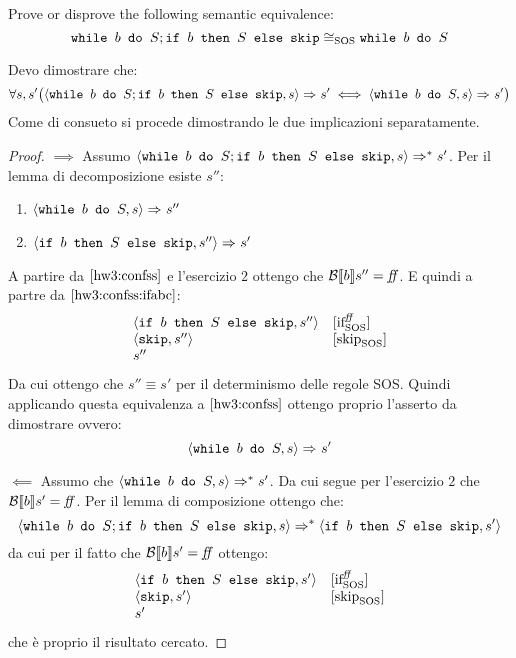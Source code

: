 {
  Prove or disprove the following semantic equivalence:
  $$
  \wbS{b}{S}; \ifABC{b}{S}{\skipForFriends} \eqSOS \wbS{b}{S}
  $$
}
{
  Devo dimostrare che:
  $$
  \forall s, s' \big( \confSs{\wbS{b}{S}; \ifABC{b}{S}{\skipForFriends}}{s}
  \Rar{} s' \iff \confSs{\wbS{b}{S}}{s} \Rar{} s'\big)
  $$
  Come di consueto si procede dimostrando le due implicazioni separatamente.
  \begin{proof}
    $\boxed{\implies}$
    Assumo $\confSs{\wbS{b}{S}; \ifABC{b}{S}{\skipForFriends}}{s} \Rar{*}
    s'$.
    Per il lemma di decomposizione esiste $s''$:
    \begin{enumerate}
    \item $\confSs{\wbS{b}{S}}{s} \Rar{ } s''$
      \label{hw3:confss}
    \item $\confSs{\ifABC{b}{S}{\skipForFriends}}{s''} \Rar{ } s'$
      \label{hw3:confss:ifabc}
    \end{enumerate}
    A partire da $\ref{hw3:confss}$ e l'esercizio $2$ ottengo che $\B{b}'' =
    \semfalse$. E quindi a partre da $\ref{hw3:confss:ifabc}$:
    $$
    \begin{array}{ll}
      \confSs{\ifABC{b}{S}{\skipForFriends}}{s''} & \ifffSOS \\
      \confSs{\skipForFriends}{s''} & \skipSOS \\
      s''
    \end{array}
    $$
    Da cui ottengo che $\boxed{s'' \equiv s'}$ per il determinismo delle regole SOS.
    Quindi applicando questa equivalenza a $\ref{hw3:confss}$ ottengo proprio
    l'asserto da dimostrare ovvero:
    $$
    \confSs{\wbS{b}{S}}{s} \Rar{} s'
    $$
    
    $\boxed{\impliedby}$
    Assumo che $\confSs{\wbS{b}{S}}{s} \Rar{*} s'$. Da cui segue per
    l'esercizio $2$ che $\B{b}' = \semfalse$.
    Per il lemma di composizione ottengo che:
    $$
    \confSs{\wbS{b}{S}; \ifABC{b}{S}{\skipForFriends}}{s} \Rar{*} \confSs{\ifABC{b}{S}{\skipForFriends}}{s'}
    $$
    da cui per il fatto che $\B{b}' = \semfalse$ ottengo:
    $$
    \begin{array}{ll}
      \confSs{\ifABC{b}{S}{\skipForFriends}}{s'} & \ifffSOS \\
      \confSs{\skipForFriends}{s'} & \skipSOS \\
      s' & \\
    \end{array}
    $$
    che è proprio il risultato cercato.
  
    
  

  \end{proof}
  
}
